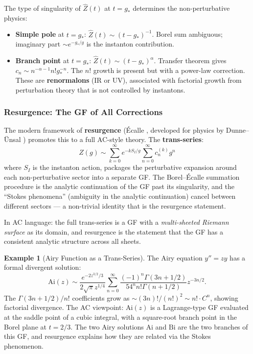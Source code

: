 \documentclass[11pt,a4paper]{article}
\theoremstyle{definition}
\newtheorem{example}[theorem]{Example}
\begin{document}
\begin{keybox}
The type of singularity of $\hat{Z}(t)$ at $t = g_*$ determines the
non-perturbative physics:
\begin{itemize}[leftmargin=1.5em]
  \item \textbf{Simple pole} at $t = g_*$: $\hat{Z}(t) \sim (t-g_*)^{-1}$.
        Borel sum ambiguous; imaginary part $\sim e^{-g_*/g}$ is the
        instanton contribution.
  \item \textbf{Branch point} at $t = g_*$: $\hat{Z}(t) \sim (t-g_*)^\alpha$.
        Transfer theorem gives $c_n \sim n^{-\alpha-1} n! g_*^{-n}$. The
        $n!$ growth is present but with a power-law correction. These are
        \textbf{renormalons} (IR or UV), associated with factorial growth
        from perturbation theory that is not controlled by instantons.
\end{itemize}
\end{keybox}

\subsubsection{Resurgence: The GF of All Corrections}

The modern framework of \textbf{resurgence} (\'Ecalle \cite{ecalle1981},
developed for physics by Dunne--\"Unsal \cite{dunne2014}) promotes this to
a full AC-style theory. The \textbf{trans-series}:
\[
  Z(g) \sim \sum_{k=0}^\infty e^{-k S_I/g} \sum_{n=0}^\infty c_n^{(k)} g^n
\]
where $S_I$ is the instanton action, packages the perturbative expansion
around each non-perturbative sector into a separate GF. The Borel--\'Ecalle
summation procedure is the analytic continuation of the GF past its
singularity, and the ``Stokes phenomena'' (ambiguity in the analytic
continuation) cancel between different sectors --- a non-trivial identity
that is the resurgence statement.

In AC language: the full trans-series is a GF with a \emph{multi-sheeted
Riemann surface} as its domain, and resurgence is the statement that the
GF has a consistent analytic structure across all sheets.

\begin{example}[Airy Function as a Trans-Series]
The Airy equation $y'' = zy$ has a formal divergent solution:
\[
  \mathrm{Ai}(z) \sim \frac{e^{-2z^{3/2}/3}}{2\sqrt{\pi}z^{1/4}}
  \sum_{n=0}^\infty \frac{(-1)^n \Gamma(3n+1/2)}{54^n n! \Gamma(n+1/2)} z^{-3n/2}.
\]
The $\Gamma(3n+1/2)/n!$ coefficients grow as $\sim (3n)!/(n!)^2 \sim n!\cdot C^n$,
showing factorial divergence. The AC viewpoint: $\mathrm{Ai}(z)$ is a Lagrange-type
GF evaluated at the saddle point of a cubic integral, with a square-root branch
point in the Borel plane at $t = 2/3$. The two Airy solutions $\mathrm{Ai}$
and $\mathrm{Bi}$ are the two branches of this GF, and resurgence explains
how they are related via the Stokes phenomenon.
\end{example}
\end{document}

